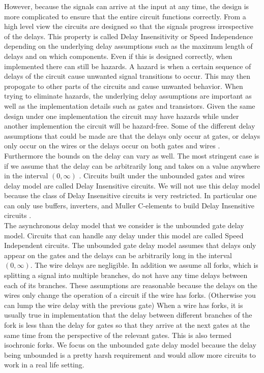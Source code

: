 \documentclass[12pt]{report}
\begin{document}
However, because the signals can arrive at the input at any time, the design is more complicated to ensure that the entire circuit functions correctly.  From a high level view the circuits are designed so that the signals progress irrespective of the delays.  This property is called Delay Insensitivity or Speed Independence depending on the underlying delay assumptions such as the maximum length of delays and on which components.  Even if this is designed correctly, when implemented there can still be hazards.  A hazard is when a certain sequence of delays of the circuit cause unwanted signal transitions to occur.  This may then propogate to other parts of the circuits and cause unwanted behavior.  When trying to eliminate hazards, the underlying delay assumptions are important as well as the implementation details such as gates and transistors. Given the same design under one implementation the circuit may have hazards while under another implemention the circuit will be hazard-free.  Some of the different delay assumptions that could be made are that the delays only occur at gates, or delays only occur on the wires or the delays occur on both gates and wires \cite{myers_book_2004}. Furthermore the bounds on the delay can vary as well. The most stringent case is if we assume that the delay can be arbitrarily long and takes on a value anywhere in the interval $(0,\infty)$ \cite{myers_book_2004}.  Circuits built under the unbounded gates and wires delay model are called Delay Insensitive circuits.  We will not use this delay model because the class of Delay Insensitive circuits is very restricted.  In particular one can only use buffers, inverters, and Muller C-elements to build Delay Insensitive circuits \cite{Martin_1990_DI} \cite{Martin1986_DI}.\\ %

The asynchronous delay model that we consider is the unbounded gate delay model.  Circuits that can handle any delay under this model are called Speed Independent circuits. The unbounded gate delay model assumes that delays only appear on the gates and the delays can be arbitrarily long in the interval $(0,\infty)$.  The wire delays are negligible.  In addition we assume all forks, which is splitting a signal into multiple branches, do not have any time delays between each of its branches.  These assumptions are reasonable because the delays on the wires only change the operation of a circuit if the wire has forks.  (Otherwise you can lump the wire delay with the previous gate)  When a wire has forks, it is usually true in implementation that the delay between different branches of the fork is less than the delay for gates so that they arrive at the next gates at the same time from the perspective of the relevant gates.  This is also termed isochronic forks.  We focus on the unbounded gate delay model because the delay being unbounded is a pretty harsh requirement and would allow more circuits to work in a real life setting. \\ %
\end{document}
